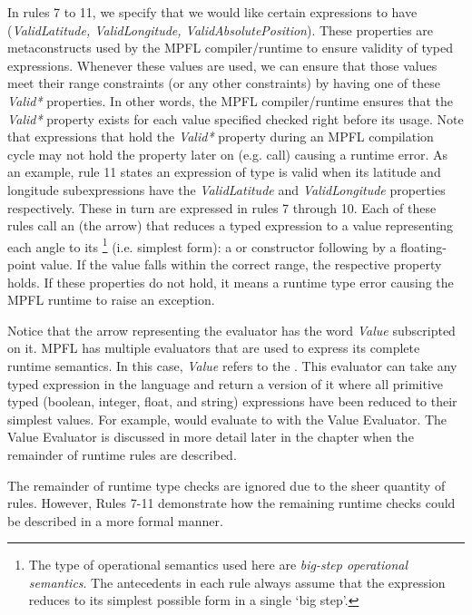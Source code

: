 In rules 7 to 11, we specify  that we would like certain expressions to have (\textit{ValidLatitude, ValidLongitude, ValidAbsolutePosition}). These properties are metaconstructs used by the MPFL compiler/runtime to ensure validity of typed expressions. Whenever these values are used, we can ensure that those values meet their range constraints (or any other constraints) by having one of these \textit{Valid*} properties. In other words, the MPFL compiler/runtime ensures that the \textit{Valid*} property exists for each value specified checked right before its usage. Note that expressions that hold the \textit{Valid*} property during an MPFL compilation cycle may not hold the property later on (e.g.  call) causing a runtime error. As an example, rule 11 states an expression of type  is valid when its latitude and longitude subexpressions have the \textit{ValidLatitude} and \textit{ValidLongitude} properties respectively. These in turn are expressed in rules 7 through 10. Each of these rules call an  (the arrow) that reduces a typed expression to a value representing each angle to its \footnote{The type of operational semantics used here are \emph{big-step operational semantics}. The antecedents in each rule always assume that the expression reduces to its simplest possible form in a single `big step'.} (i.e. simplest form): a  or  constructor following by a floating-point value. If the value falls within the correct range, the respective property holds. If these properties do not hold, it means a runtime type error causing the MPFL runtime to raise an exception.

Notice that the arrow representing the evaluator has the word \emph{Value} subscripted on it. MPFL has multiple evaluators that are used to express its complete runtime semantics. In this case, \emph{Value} refers to the . This evaluator can take any typed expression in the language and return a version of it where all primitive typed (boolean, integer, float, and string) expressions have been reduced to their simplest values. For example,  would evaluate to  with the Value Evaluator. The Value Evaluator is discussed in more detail later in the chapter when the remainder of runtime rules are described.

The remainder of runtime type checks are ignored due to the sheer quantity of rules. However, Rules 7-11 demonstrate how the remaining runtime checks could be described in a more formal manner.

